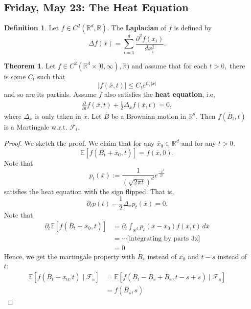 \documentclass[10pt, oneside]{article}
\newcommand{\bbR}{\mathbb{R}}
\newcommand{\bbE}{\mathbb{E}}
\theoremstyle{definition}
\newtheorem{thm}{Theorem}
\newtheorem{defn}{Definition}
\begin{document}
\subsection{Friday, May 23: The Heat Equation}
\begin{defn}
    Let $f\in C^2(\bbR^d, \bbR).$ The \textbf{Laplacian} of $f$ is defined by 
    \[\Delta f (\overline{x}) = \sum_{i=1}^d \frac{\partial^2 f(x_i)}{dx_i^2}.\]
\end{defn}
\begin{thm}
    Let $f\in C^2(\bbR^d \times [0,\infty), \bbR)$ and assume that for each $t>0,$ there is some $C_t$ such that 
    \[|f(\overline{x}, t)| \leq C_t e^{C_t |\overline{x}|}\] and so are its partials. Assume $f$ also satisfies the \textbf{heat equation}, i.e, 
    \begin{align}
    \frac{\partial}{\partial t}f(\overline{x}, t) + \frac{1}{2}\Delta_{\overline{x}} f(\overline{x}, t) = 0    ,
    \end{align}
    where $\Delta_\overline{x}$ is only taken in $\overline{x}.$ Let $\overline{B}$ be a Brownian motion in $\bbR^d.$ Then $f(\overline{B}_t, t)$ is a Martingale w.r.t. $\mathcal{F}_t.$
\end{thm}
\begin{proof}
    We sketch the proof. We claim that for any $\overline{x}_0 \in \bbR^d$ and for any $t>0,$
    \[\bbE[f(\overline{B}_t + \overline{x}_0, t)] = f(\overline{x}, 0).\] Note that 
    \[p_t(\overline{x}) := \frac{1}{(\sqrt{2\pi t})^d}e^{\frac{-\overline{x}^2}{2t}}\] satisfies the heat equation with the sign flipped. That is, 
    \[\partial_t p(t)- \frac{1}{2}\Delta_{\overline{x}}p_t(\overline{x}) = 0.\] Note that 
    \begin{align*}
        \partial_t\bbE[f(\overline{B}_t  + \overline{x}_0, t)] &= \partial_t \int_{\bbR^d} p_t(\overline{x} - \overline{x}_0)f(\overline{x}, t)\,d\overline{x}\\
        &= \cdots \text{[integrating by parts 3x]}\\
        &= 0
    \end{align*}
    Hence, we get the martingale property with $\overline{B}_s$ instead of $\overline{x}_0$ and $t-s$ instead of $t$:
    \begin{align*}
        \bbE[f(\overline{B}_t + \overline{x}_0, t )\mid \mathcal{F}_s] &= \bbE[f(\overline{B}_t - \overline{B}_s + \overline{B}_s , t-s + s)\mid \mathcal{F}_s]\\
        &= f(\overline{B}_s, s)
    \end{align*}
\end{proof}
\end{document}
